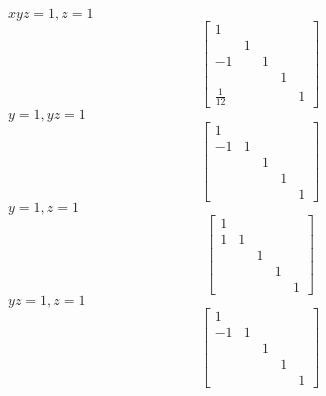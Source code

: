 \documentclass[main]{subfiles}
\begin{document}
$xyz=1,z=1$
\[
\begin{bmatrix}
1\\
&1\\
-1&&1\\
&&&1\\
\frac{1}{12}&&&&1
\end{bmatrix}
\]
$y=1,yz=1$
\[
\begin{bmatrix}
1\\
-1&1\\
&&1\\
&&&1\\
&&&&1
\end{bmatrix}
\]
$y=1,z=1$
\[
\begin{bmatrix}
1\\
1&1\\
&&1\\
&&&1\\
&&&&1
\end{bmatrix}
\]
$yz=1,z=1$
\[
\begin{bmatrix}
1\\
-1&1\\
&&1\\
&&&1\\
&&&&1
\end{bmatrix}
\]
\end{document}
